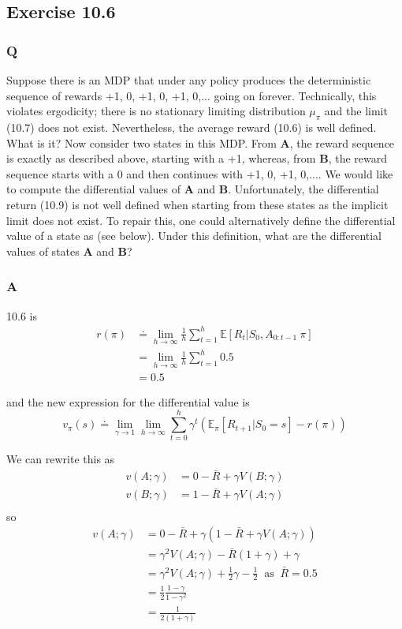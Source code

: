 \subsection{Exercise 10.6}
\subsubsection{Q}
Suppose there is an MDP that under any policy produces the deterministic sequence of rewards +1, 0, +1, 0, +1, 0,... going on forever. Technically, this violates ergodicity; there is no stationary limiting distribution $\mu_\pi$ and the limit (10.7) does not exist. Nevertheless, the average reward (10.6) is well defined. What is it? Now consider two states in this MDP. From \textbf{A}, the reward sequence is exactly as described above, starting with a +1, whereas, from \textbf{B}, the reward sequence starts with a 0 and then continues with +1, 0, +1, 0,.... We would like to compute the differential values of \textbf{A} and \textbf{B}. Unfortunately, the differential return (10.9) is not well defined when starting from these states as the implicit limit does not exist. To repair this, one could alternatively define the differential value of a state as (see below). Under this definition, what are the differential values of states \textbf{A} and \textbf{B}?
\subsubsection{A}
10.6 is
\begin{align}
r(\pi) &\doteq \lim_{h \rightarrow \infty}\frac{1}{h} \sum_{t=1}^{h} \mathbb{E} \left[R_t | S_0, A_{0:t-1} ~ \pi \right] \\
&= \lim_{h \rightarrow \infty}\frac{1}{h} \sum_{t=1}^{h} 0.5 \\
&= 0.5
\end{align}

and the new expression for the differential value is
\begin{equation}
v_\pi(s) \doteq \lim_{\gamma \rightarrow 1} \lim_{h \rightarrow \infty} \sum_{t=0}^{h} \gamma^t \left(\mathbb{E}_\pi[R_{t+1} | S_0 = s] - r(\pi) \right)
\end{equation}

We can rewrite this as
\begin{align}
v(A; \gamma) &= 0 - \bar{R} + \gamma V(B; \gamma) \\ 
v(B; \gamma) &= 1 - \bar{R} + \gamma V(A; \gamma) \\ 
\end{align}
so 
\begin{align}
v(A; \gamma) &= 0 - \bar{R} + \gamma \left(1 - \bar{R} + \gamma V(A; \gamma)\right) \\
&= \gamma^2 V(A; \gamma) - \bar{R}(1 + \gamma) + \gamma \\
&= \gamma^2 V(A; \gamma) + \frac{1}{2} \gamma - \frac{1}{2} \; \; \text{as} \; \; \bar{R} = 0.5 \\
&= \frac{1}{2} \frac{1 - \gamma}{1 - \gamma^2} \\
&= \frac{1}{2(1+ \gamma)}
\end{align}

